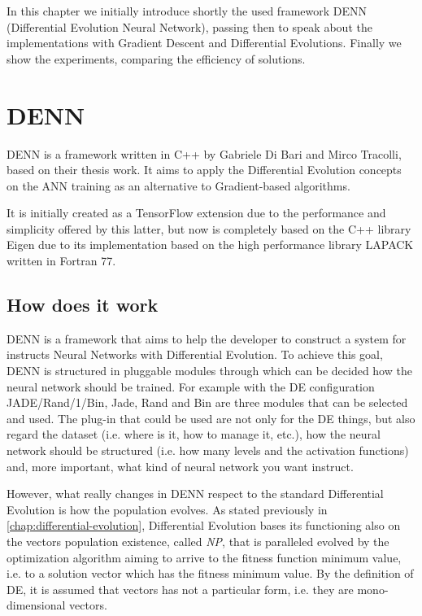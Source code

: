 In this chapter we initially introduce shortly the used framework DENN (Differential Evolution Neural Network), passing then to speak about the implementations with Gradient Descent and Differential Evolutions. Finally we show the experiments, comparing the efficiency of solutions.

\section{DENN}\label{sec:DENN}
DENN is a framework written in C++ by Gabriele Di Bari and Mirco Tracolli, based on their thesis work. It aims to apply the Differential Evolution concepts on the ANN training as an alternative to Gradient-based algorithms. 

It is initially created as a TensorFlow extension due to the performance and simplicity offered by this latter, but now is completely based on the C++ library Eigen due to its implementation based on the high performance library LAPACK written in Fortran 77.

\subsection{How does it work}
DENN is a framework that aims to help the developer to construct a system for instructs Neural Networks with Differential Evolution. To achieve this goal, DENN is structured in pluggable modules through which can be decided how the neural network should be trained. For example with the DE configuration JADE/Rand/1/Bin, Jade, Rand and Bin are three modules that can be selected and used. The plug-in that could be used are not only for the DE things, but also regard the dataset (i.e. where is it, how to manage it, etc.), how the neural network should be structured (i.e. how many levels and the activation functions) and, more important, what kind of neural network you want instruct.

However, what really changes in DENN respect to the standard Differential Evolution is how the population evolves. As stated previously in \ref{chap:differential-evolution}, Differential Evolution bases its functioning also on the vectors population existence, called \textit{NP}, that is paralleled evolved by the optimization algorithm aiming to arrive to the fitness function minimum value, i.e. to a solution vector which has the fitness minimum value. By the definition of DE, it is assumed that vectors has not a particular form, i.e. they are mono-dimensional vectors. 

